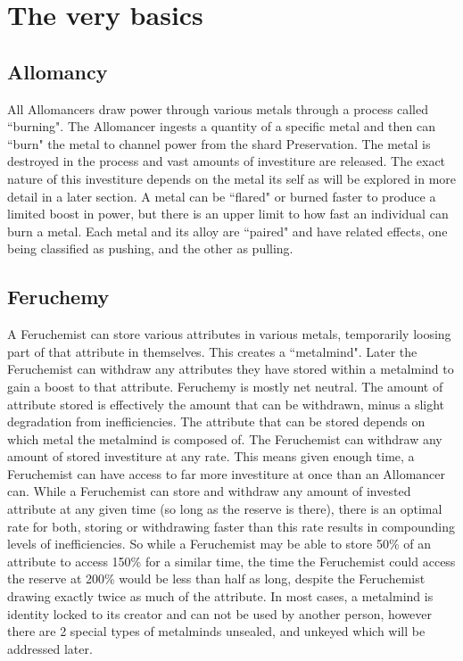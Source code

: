 \documentclass[conference]{IEEEtran}
\begin{document}
\section*{The very basics}
\subsection*{Allomancy}
All Allomancers draw power through various metals through a process called ``burning".  The Allomancer ingests a quantity of a specific metal and then can ``burn" the metal to channel power from the shard Preservation.  The metal is destroyed in the process and vast amounts of investiture are released.  The exact nature of this investiture depends on the metal its self as will be explored in more detail in a later section.  A metal can be ``flared" or burned faster to produce a limited boost in power, but there is an upper limit to how fast an individual can burn a metal.  Each metal and its alloy are ``paired" and have related effects, one being classified as pushing, and the other as pulling.
\subsection*{Feruchemy}
A Feruchemist can store various attributes in various metals, temporarily loosing part of that attribute in themselves.  This creates a ``metalmind".  Later the Feruchemist can withdraw any attributes they have stored within a metalmind to gain a boost to that attribute.  Feruchemy is mostly net neutral.  The amount of attribute stored is effectively the amount that can be withdrawn, minus a slight degradation from inefficiencies.  The attribute that can be stored depends on which metal the metalmind is composed of.  The Feruchemist can withdraw any amount of stored investiture at any rate.  This means given enough time, a Feruchemist can have access to far more investiture at once than an Allomancer can.
While a Feruchemist can store and withdraw any amount of invested attribute at any given time (so long as the reserve is there), there is an optimal rate for both, storing or withdrawing faster than this rate results in compounding levels of inefficiencies.   So while a Feruchemist may be able to store 50\% of an attribute to access 150\% for a similar time, the time the Feruchemist could access the reserve at 200\% would be less than half as long, despite the Feruchemist drawing exactly twice as much of the attribute. 
In most cases, a metalmind is identity locked to its creator and can not be used by another person, however there are 2 special types of metalminds unsealed, and unkeyed which will be addressed later.
\end{document}
